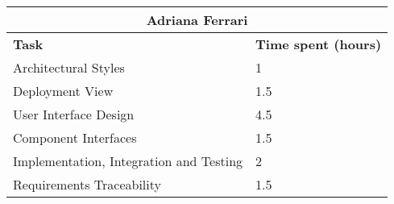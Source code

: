 \begin{table}[h]
  \center
  \begin{tabular}{l|l}
    \multicolumn{2}{c}{\textbf{Adriana Ferrari}} \\
    \hline
    \textbf{Task} & \textbf{Time spent (hours)}\\
    \hline
    Architectural Styles & 1 \\
    Deployment View & 1.5 \\
    User Interface Design & 4.5 \\
    Component Interfaces & 1.5 \\ 
    Implementation, Integration and Testing & 2 \\
    Requirements Traceability & 1.5 \\
  \end{tabular}
\end{table}